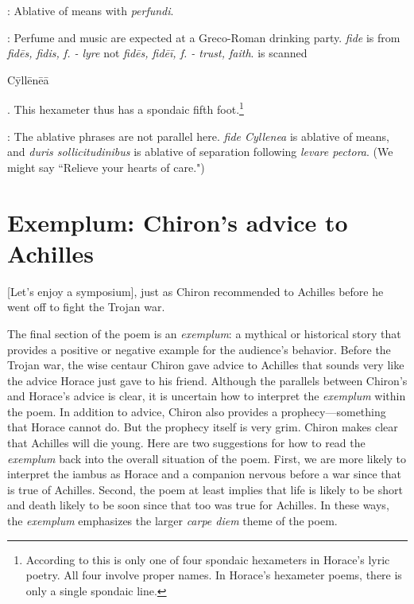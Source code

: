 
: Ablative of means with \textit{perfundi}.


: Perfume and music are expected at a Greco-Roman drinking party.  \textit{fide} is from \textit{fidēs, fidis, f. - lyre} not  \textit{fidēs, fidēī, f. - trust, faith}.\indent{} is scanned \begin{metrica}C\=yll\=en\=e\=a\end{metrica}.  This hexameter thus has a spondaic fifth foot.\footnote{According to \citet[220]{mankin1995} this is only one of four spondaic hexameters in Horace's lyric poetry.  All four involve proper names.  In Horace's hexameter poems, there is only a single spondaic line.}


: The ablative phrases are not parallel here.  \textit{fide Cyllenea} is ablative of means, and \textit{duris sollicitudinibus} is ablative of separation following \textit{levare pectora}.  (We might say ``Relieve your hearts of care.") 


\section*{Exemplum: Chiron's advice to Achilles}

[Let's enjoy a symposium], just as Chiron recommended to Achilles before he went off to fight the Trojan war.

The final section of the poem is an \textit{exemplum}: a mythical or historical story that provides a positive or negative example for the audience's behavior.  Before the Trojan war, the wise centaur Chiron gave advice to Achilles that sounds very like the advice Horace just gave to his friend.  Although the parallels between Chiron's and Horace's advice is clear, it is uncertain how to interpret the \textit{exemplum} within the poem.  In addition to advice, Chiron also provides a prophecy---something that Horace cannot do.  But the prophecy itself is very grim.  Chiron makes clear that Achilles will die young.  Here are two suggestions for how to read the \textit{exemplum} back into the overall situation of the poem.  First, we are more likely to interpret the iambus as Horace and a companion nervous before a war since that is true of Achilles.  Second, the poem at least implies that life is likely to be short and death likely to be soon since that too was true for Achilles.  In these ways, the \textit{exemplum} emphasizes the larger \textit{carpe diem} theme of the poem.

